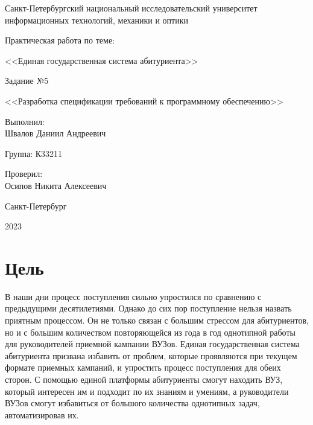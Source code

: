 \documentclass[a4paper, 14pt]{extarticle}
\begin{document}
\begin{titlepage}
  \vspace{0pt plus2fill}
  \noindent

  \vspace{0pt plus6fill}
  \begin{center}
    Санкт-Петербургский национальный исследовательский университет
    информационных технологий, механики и оптики

    \vspace{0pt plus2fill}

    Практическая работа по теме:

    <<Единая государственная система абитуриента>>

    \vspace{0pt plus1fill}

    Задание №5

    <<Разработка спецификации требований к программному обеспечению>>

  \end{center}

  \vspace{0pt plus7fill}
  \begin{flushright}
    Выполнил: \\
    Швалов Даниил Андреевич

    Группа: К33211

    Проверил: \\
    Осипов Никита Алексеевич
  \end{flushright}

  \vspace{0pt plus2fill}
  \begin{center}
    Санкт-Петербург

    2023
  \end{center}
\end{titlepage}

\setcounter{page}{2}

\section{Цель}

В наши дни процесс поступления сильно упростился по сравнению с предыдущими
десятилетиями. Однако до сих пор поступление нельзя назвать приятным процессом.
Он не только связан с большим стрессом для абитуриентов, но и с большим
количеством повторяющейся из года в год однотипной работы для руководителей
приемной кампании ВУЗов. Единая государственная система абитуриента призвана
избавить от проблем, которые проявляются при текущем формате приемных кампаний,
и упростить процесс поступления для обеих сторон. С помощью единой платформы
абитуриенты смогут находить ВУЗ, который интересен им и подходит по их знаниям и
умениям, а руководители ВУЗов смогут избавиться от большого количества
однотипных задач, автоматизировав их.
\end{document}
